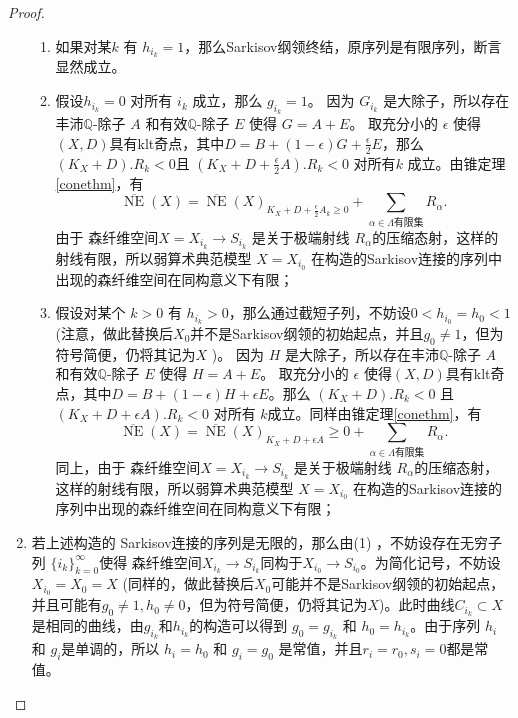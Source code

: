 \begin{proof}
\begin{enumerate}
\begin{enumerate}
        \item 如果对某$k$ 有  $h_{i_{k}}=1$，那么Sarkisov纲领终结，原序列是有限序列，断言显然成立。
        \item 假设$h_{i_{k}}=0$ 对所有 $i_{k}$ 成立，那么 $g_{i_{k}}=1$。 因为 $G_{i_{k}}$ 是大除子，所以存在丰沛$\mathbb{Q}$-除子 $A$ 和有效$\mathbb{Q}$-除子 $E$ 使得 $G=A+E$。  取充分小的 $\epsilon$ 使得$(X,D)$具有klt奇点，其中$D=B+(1-\epsilon)G+\frac{\epsilon}{2} E$，那么 $(K_{X}+D).R_{k}<0$且 $(K_{X}+D+\frac{\epsilon}{2} A).R_{k}<0$ 对所有$k$ 成立。由锥定理\ref{conethm}，有
              \[
                \overline{\operatorname{NE}}(X)=\overline{\operatorname{NE}}(X)_{K_{X}+D+\frac{\epsilon}{2}A_{k}\geqslant 0} +\sum_{\alpha \in\Lambda\text{有限集}}R_{\alpha}.
              \]
              由于 森纤维空间$X=X_{i_{k}}\to S_{i_{k}}$ 是关于极端射线 $R_{\alpha}$的压缩态射，这样的射线有限，所以弱算术典范模型 $X=X_{i_{0}}$ 在构造的Sarkisov连接的序列中出现的森纤维空间在同构意义下有限；
            \item 假设对某个 $k>0$ 有  $h_{i_{k}}>0$，那么通过截短子列，不妨设$0<h_{i_{0}}=h_{0}<1$ (注意，做此替换后$X_{0}$并不是Sarkisov纲领的初始起点，并且$g_{0}\neq 1$，但为符号简便，仍将其记为$X$  )。 因为 $H$ 是大除子，所以存在丰沛$\mathbb{Q}$-除子 $A$ 和有效$\mathbb{Q}$-除子 $E$ 使得 $H=A+E$。  取充分小的 $\epsilon$ 使得$(X,D)$具有klt奇点，其中$D=B+(1-\epsilon)H+\epsilon E$。那么 $(K_{X}+D).R_{k}<0$ 且 $(K_{X}+D+\epsilon A).R_{k}<0$ 对所有 $k$成立。同样由锥定理\ref{conethm}，有
              \[
                \overline{\operatorname{NE}}(X)=\overline{\operatorname{NE}}(X)_{K_{X}+D+\epsilon A}\geqslant 0 +\sum_{\alpha \in\Lambda\text{有限集}}R_{\alpha}.
              \]
              同上，由于 森纤维空间$X=X_{i_{k}}\to S_{i_{k}}$ 是关于极端射线 $R_{\alpha}$的压缩态射，这样的射线有限，所以弱算术典范模型 $X=X_{i_{0}}$ 在构造的Sarkisov连接的序列中出现的森纤维空间在同构意义下有限；
      \end{enumerate}
    \item 若上述构造的 Sarkisov连接的序列是无限的，那么由(1) ，不妨设存在无穷子列 $\{i_{k}\}_{k=0}^{\infty} $使得 森纤维空间$X_{i_{k}}\to S_{i_{k}}$同构于$X_{i_{0}}\to S_{i_{0}}$。为简化记号，不妨设$X_{i_{0}}=X_{0}=X$ (同样的，做此替换后$X_{0}$可能并不是Sarkisov纲领的初始起点，并且可能有$g_{0}\neq 1,h_{0}\neq 0$，但为符号简便，仍将其记为$X$)。此时曲线$C_{i_{k}} \subset X$是相同的曲线，由$g_{i_{k}}$和$h_{i_{k}}$的构造可以得到 $g_{0}=g_{i_{k}}$ 和 $h_{0}=h_{i_{k}}$。由于序列 $h_{i}$ 和 $g_{i}$是单调的，所以 $h_{i}=h_{0}$ 和  $g_{i}=g_{0}$ 是常值，并且$r_{i}=r_{0},s_{i}=0$都是常值。


\end{enumerate}
\end{proof}
